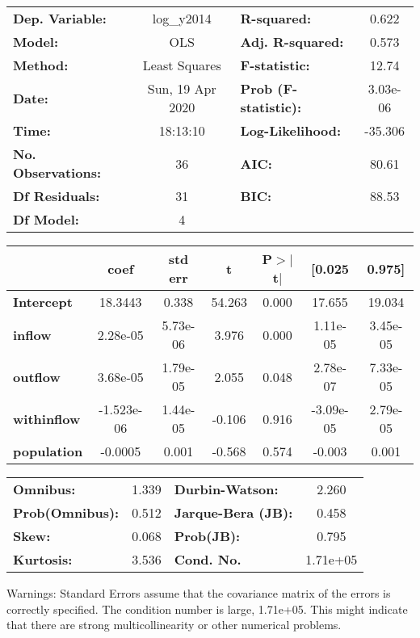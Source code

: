 \begin{center}
\begin{tabular}{lclc}
\toprule
\textbf{Dep. Variable:}    &    log\_y2014    & \textbf{  R-squared:         } &     0.622   \\
\textbf{Model:}            &       OLS        & \textbf{  Adj. R-squared:    } &     0.573   \\
\textbf{Method:}           &  Least Squares   & \textbf{  F-statistic:       } &     12.74   \\
\textbf{Date:}             & Sun, 19 Apr 2020 & \textbf{  Prob (F-statistic):} &  3.03e-06   \\
\textbf{Time:}             &     18:13:10     & \textbf{  Log-Likelihood:    } &   -35.306   \\
\textbf{No. Observations:} &          36      & \textbf{  AIC:               } &     80.61   \\
\textbf{Df Residuals:}     &          31      & \textbf{  BIC:               } &     88.53   \\
\textbf{Df Model:}         &           4      & \textbf{                     } &             \\
\bottomrule
\end{tabular}
\begin{tabular}{lcccccc}
                    & \textbf{coef} & \textbf{std err} & \textbf{t} & \textbf{P$> |$t$|$} & \textbf{[0.025} & \textbf{0.975]}  \\
\midrule
\textbf{Intercept}  &      18.3443  &        0.338     &    54.263  &         0.000        &       17.655    &       19.034     \\
\textbf{inflow}     &     2.28e-05  &     5.73e-06     &     3.976  &         0.000        &     1.11e-05    &     3.45e-05     \\
\textbf{outflow}    &     3.68e-05  &     1.79e-05     &     2.055  &         0.048        &     2.78e-07    &     7.33e-05     \\
\textbf{withinflow} &   -1.523e-06  &     1.44e-05     &    -0.106  &         0.916        &    -3.09e-05    &     2.79e-05     \\
\textbf{population} &      -0.0005  &        0.001     &    -0.568  &         0.574        &       -0.003    &        0.001     \\
\bottomrule
\end{tabular}
\begin{tabular}{lclc}
\textbf{Omnibus:}       &  1.339 & \textbf{  Durbin-Watson:     } &    2.260  \\
\textbf{Prob(Omnibus):} &  0.512 & \textbf{  Jarque-Bera (JB):  } &    0.458  \\
\textbf{Skew:}          &  0.068 & \textbf{  Prob(JB):          } &    0.795  \\
\textbf{Kurtosis:}      &  3.536 & \textbf{  Cond. No.          } & 1.71e+05  \\
\bottomrule
\end{tabular}
\end{center}

Warnings: \newline
 [1] Standard Errors assume that the covariance matrix of the errors is correctly specified. \newline
 [2] The condition number is large, 1.71e+05. This might indicate that there are \newline
 strong multicollinearity or other numerical problems.